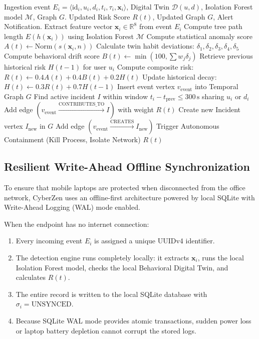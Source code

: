 \documentclass[conference]{IEEEtran}
\begin{document}
\begin{algorithm}[h]
\caption{CyberZen Real-Time Threat Evaluation and Correlation}
\label{alg:detection}
\begin{algorithmic}[1]
\REQUIRE Ingestion event $E_i = \langle \text{id}_i, u_i, d_i, t_i, \tau_i, \mathbf{x}_i \rangle$, Digital Twin $\mathcal{D}(u, d)$, Isolation Forest model $\mathcal{M}$, Graph $G$.
\ENSURE Updated Risk Score $R(t)$, Updated Graph $G$, Alert Notification.
\STATE Extract feature vector $\mathbf{x}_i \in \mathbb{R}^8$ from event $E_i$
\STATE Compute tree path length $E(h(\mathbf{x}_i))$ using Isolation Forest $\mathcal{M}$
\STATE Compute statistical anomaly score $A(t) \leftarrow \text{Norm}(s(\mathbf{x}_i, n))$
\STATE Calculate twin habit deviations: $\delta_1, \delta_2, \delta_3, \delta_4, \delta_5$
\STATE Compute behavioral drift score $B(t) \leftarrow \min(100, \sum w_j \delta_j)$
\STATE Retrieve previous historical risk $H(t-1)$ for user $u_i$
\STATE Compute composite risk: $R(t) \leftarrow 0.4 A(t) + 0.4 B(t) + 0.2 H(t)$
\STATE Update historical decay: $H(t) \leftarrow 0.3 R(t) + 0.7 H(t-1)$
    \STATE Insert event vertex $v_{\text{event}}$ into Temporal Graph $G$
    \STATE Find active incident $I$ within window $t_i - t_{\text{prev}} \le 300\,\text{s}$ sharing $u_i$ or $d_i$
        \STATE Add edge $(v_{\text{event}} \xrightarrow{\text{CONTRIBUTES\_TO}} I)$ with weight $R(t)$
    \ELSE
        \STATE Create new Incident vertex $I_{\text{new}}$ in $G$
        \STATE Add edge $(v_{\text{event}} \xrightarrow{\text{CREATES}} I_{\text{new}})$
    \ENDIF
\ENDIF
{}
    \STATE Trigger Autonomous Containment (Kill Process, Isolate Network)
\ENDIF
\RETURN $R(t)$
\end{algorithmic}
\end{algorithm}

\subsection{Resilient Write-Ahead Offline Synchronization}
To ensure that mobile laptops are protected when disconnected from the office network, CyberZen uses an offline-first architecture powered by local SQLite with Write-Ahead Logging (WAL) mode enabled.

When the endpoint has no internet connection:
\begin{enumerate}
    \item Every incoming event $E_i$ is assigned a unique UUIDv4 identifier.
    \item The detection engine runs completely locally: it extracts $\mathbf{x}_i$, runs the local Isolation Forest model, checks the local Behavioral Digital Twin, and calculates $R(t)$.
    \item The entire record is written to the local SQLite database with $\sigma_i = \text{UNSYNCED}$.
    \item Because SQLite WAL mode provides atomic transactions, sudden power loss or laptop battery depletion cannot corrupt the stored logs.
\end{enumerate}
\end{document}
